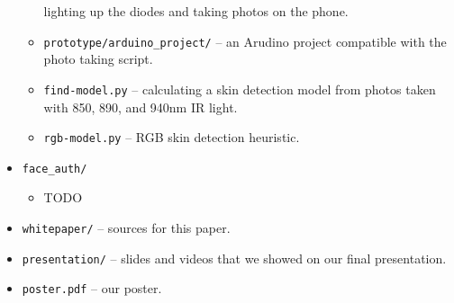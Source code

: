 \begin{itemize}
\begin{itemize}
          lighting up the diodes and taking photos on the phone.
          \item \texttt{prototype/arduino\_project/} -- an Arudino project
          compatible with the photo taking script.
          \item \texttt{find-model.py} -- calculating a skin detection model from
          photos taken with 850, 890, and 940nm IR light.
          \item \texttt{rgb-model.py} -- RGB skin detection heuristic.
      \end{itemize}
      \item \texttt{face\_auth/}
      \begin{itemize}
          \item TODO
      \end{itemize}
      \item \texttt{whitepaper/} -- sources for this paper.
      \item \texttt{presentation/} -- slides and videos that we showed on our
      final presentation.
      \item \texttt{poster.pdf} -- our poster.

    \end{itemize}
